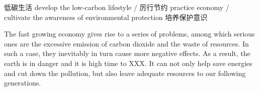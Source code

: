 
低碳生活 develop the low-carbon lifestyle / 厉行节约 practice economy
/ cultivate the awareness of environmental protection 培养保护意识

The fast growing economy gives rise to a series of problems, among which 
serious ones are the excessive emission of carbon dioxide and the waste of resources.
In such a case, they inevitably in turn cause more negative effects. As a result, 
the earth is in danger and it is high time to XXX. It can not only help save 
energies and cut down the pollution, but also leave adequate resources to 
our following generations. 